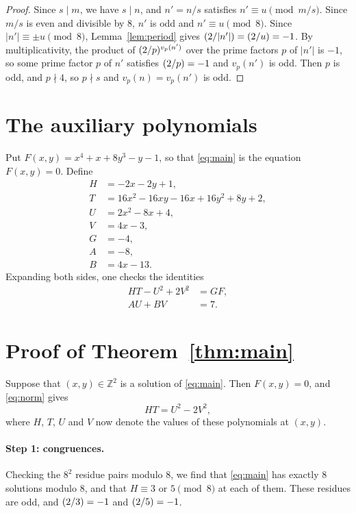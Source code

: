 \documentclass[11pt]{article}
\newcommand{\Z}{\mathbb{Z}}
\newcommand{\leg}[2]{\mathchoice{\biggl(\dfrac{#1}{#2}\biggr)}{(#1/#2)}{(#1/#2)}{(#1/#2)}}
\begin{document}
\begin{proof}
Since $s\mid m$, we have $s\mid n$, and $n'=n/s$ satisfies $n'\equiv u\pmod{m/s}$. Since $m/s$ is even and divisible by $8$, $n'$ is odd and $n'\equiv u\pmod{8}$. Since $|n'|\equiv\pm u\pmod{8}$, Lemma~\ref{lem:period} gives $\leg{2}{|n'|}=\leg{2}{u}=-1$. By multiplicativity, the product of $\leg{2}{p}^{v_p(n')}$ over the prime factors $p$ of $|n'|$ is $-1$, so some prime factor $p$ of $n'$ satisfies $\leg{2}{p}=-1$ and $v_p(n')$ is odd. Then $p$ is odd, and $p\nmid4$, so $p\nmid s$ and $v_p(n)=v_p(n')$ is odd.
\end{proof}

\section{The auxiliary polynomials}

Put $F(x,y)=x^{4}+x+8y^{3}-y-1$, so that \eqref{eq:main} is the equation $F(x,y)=0$. Define
\begin{align*}
H&=-2x-2y+1,\\
T&=16x^{2}-16xy-16x+16y^{2}+8y+2,\\
U&=2x^{2}-8x+4,\\
V&=4x-3,\\
G&=-4,\\
A&=-8,\\
B&=4x-13.
\end{align*}
Expanding both sides, one checks the identities
\begin{align}
HT-U^2+2V^2&=GF,\label{eq:norm}\\
AU+BV&=7.\label{eq:bezout}
\end{align}

\section{Proof of Theorem~\ref{thm:main}}

Suppose that $(x,y)\in\Z^2$ is a solution of \eqref{eq:main}. Then $F(x,y)=0$, and \eqref{eq:norm} gives
\begin{equation}\label{eq:HT}
HT=U^2-2V^2,
\end{equation}
where $H$, $T$, $U$ and $V$ now denote the values of these polynomials at $(x,y)$.

\paragraph{Step 1: congruences.} Checking the $8^2$ residue pairs modulo $8$, we find that \eqref{eq:main} has exactly 8 solutions modulo $8$, and that $H\equiv3\text{ or }5\pmod{8}$ at each of them. These residues are odd, and $\leg{2}{3}=-1$ and $\leg{2}{5}=-1$.
\end{document}
